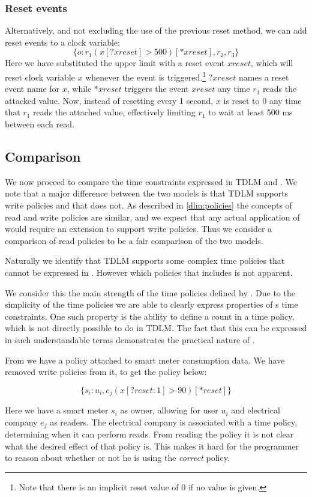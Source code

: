 \subsubsection{Reset events}
Alternatively, and not excluding the use of the previous reset method, we can add reset events to a clock variable:
  \[ \{ o : r_1(x[?xreset] > 500)[*xreset], r_2, r_3 \} \]
Here we have substituted the upper limit with a reset event $xreset$, which will reset clock variable $x$ whenever the event is triggered.\footnote{Note that there is an implicit reset value of 0 if no value is given.}
$?xreset$ names a reset event name for $x$, while $*xreset$ triggers the event $xreset$ any time $r_1$ reads the attacked value.
Now, instead of resetting every 1 second, $x$ is reset to 0 any time that $r_1$ reads the attached value, effectively limiting $r_1$ to wait at least 500 ms between each read.

\subsection{Comparison}
We now proceed to compare the time constraints expressed in TDLM and \thelang.
We note that a major difference between the two models is that TDLM supports write policies and that \thelang{} does not.
As described in \cref{dlm:policies} the concepts of read and write policies are similar, and we expect that any actual application of \thelang{} would require an extension to support write policies.
Thus we consider a comparison of read policies to be a fair comparison of the two models.

Naturally we identify that TDLM supports some complex time policies that cannot be expressed in \thelang.
However which policies that includes is not apparent.

We consider this the main strength of the time policies defined by \thelang.
Due to the simplicity of the time policies we are able to clearly express properties of \thelang{}s time constraints.
One such property is the ability to define a count in a time policy, which is not directly possible to do in TDLM.
The fact that this can be expressed in such understandable terms demonstrates the practical nature of \thelang.

From \cite{pedersen2015} we have a policy attached to smart meter consumption data.
We have removed write policies from it, to get the policy below:

\[ \{s_i : u_i, e_j (x[?reset : 1] > 90)[*reset] \} \]

Here we have a smart meter $s_i$ as owner, allowing for user $u_i$ and electrical company $e_j$ as readers.
The electrical company is associated with a time policy, determining when it can perform reads.
From reading the policy it is not clear what the desired effect of that policy is.
This makes it hard for the programmer to reason about whether or not he is using the \emph{correct} policy.

